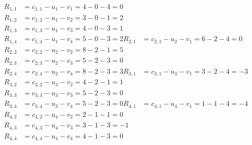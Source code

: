 \[
\begin{aligned}
R_{1,1} &= c_{1,1} - u_{1} - v_{1} = 4 - 0 - 4 = 0 \\
R_{1,2} &= c_{1,2} - u_{1} - v_{2} = 3 - 0 - 1 = 2 \\
R_{1,3} &= c_{1,3} - u_{1} - v_{3} = 4 - 0 - 3 = 1 \\
R_{1,4} &= c_{1,4} - u_{1} - v_{4} = 5 - 0 - 3 = 2 
R_{2,1} &= c_{2,1} - u_{2} - v_{1} = 6 - 2 - 4 = 0 \\
R_{2,2} &= c_{2,2} - u_{2} - v_{2} = 8 - 2 - 1 = 5 \\
R_{2,3} &= c_{2,3} - u_{2} - v_{3} = 5 - 2 - 3 = 0 \\
R_{2,4} &= c_{2,4} - u_{2} - v_{4} = 8 - 2 - 3 = 3 
R_{3,1} &= c_{3,1} - u_{3} - v_{1} = 3 - 2 - 4 = -3 \\
R_{3,2} &= c_{3,2} - u_{3} - v_{2} = 4 - 2 - 1 = 1 \\
R_{3,3} &= c_{3,3} - u_{3} - v_{3} = 5 - 2 - 3 = 0 \\
R_{3,4} &= c_{3,4} - u_{3} - v_{4} = 5 - 2 - 3 = 0 
R_{4,1} &= c_{4,1} - u_{4} - v_{1} = 1 - 1 - 4 = -4 \\
R_{4,2} &= c_{4,2} - u_{4} - v_{2} = 2 - 1 - 1 = 0 \\
R_{4,3} &= c_{4,3} - u_{4} - v_{3} = 3 - 1 - 3 = -1 \\
R_{4,4} &= c_{4,4} - u_{4} - v_{4} = 4 - 1 - 3 = 0 
\end{aligned}
\]

